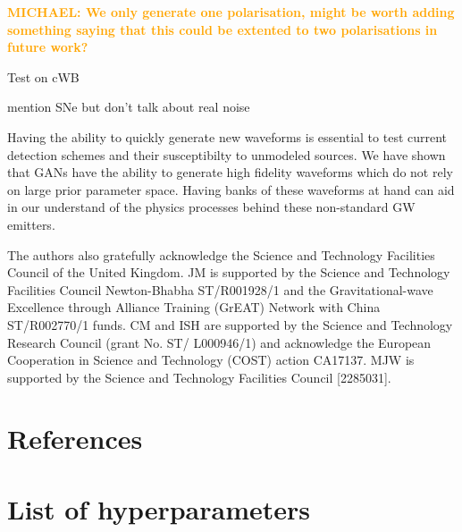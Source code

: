 \documentclass[12pt]{iopart}
\newcommand{\michael}[1]{\textbf{\textcolor{orange}{MICHAEL: #1}}}
\begin{document}
\michael{We only generate one polarisation, might be worth adding something saying that this could be extented to two polarisations in future work?}

Test on cWB 

mention SNe but don't talk about real noise

Having the ability to quickly
generate new waveforms is essential to test current detection schemes and their
susceptibilty to unmodeled sources. We have shown that \acp{GAN} have the ability
to generate high fidelity waveforms which do not rely on large prior parameter space. Having banks of these
waveforms at hand can aid in our understand of the physics processes behind
these non-standard \ac{GW} emitters.  

\ack

The authors also gratefully acknowledge the Science and Technology Facilities Council of the United Kingdom. JM is supported by the Science and Technology Facilities Council Newton-Bhabha ST/R001928/1 and the Gravitational-wave Excellence through Alliance Training (GrEAT) Network with China ST/R002770/1 funds. CM and ISH are supported by the Science and Technology Research Council (grant No. ST/ L000946/1) and acknowledge the European Cooperation in Science and Technology (COST) action CA17137. MJW is supported by the Science and Technology Facilities Council [2285031].

\clearpage

\section*{References}


\clearpage

\appendix
\section{List of hyperparameters}
\end{document}
